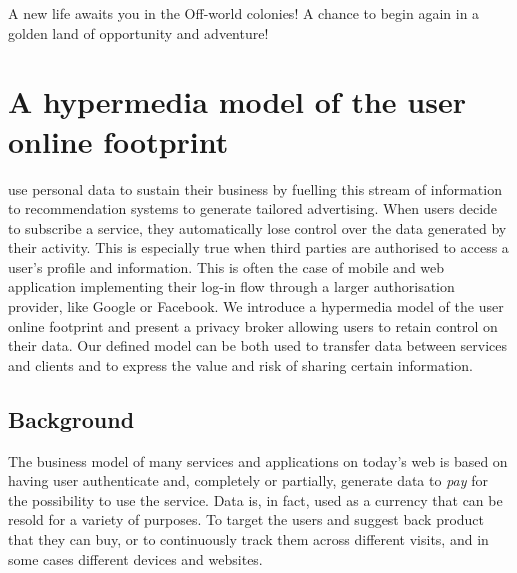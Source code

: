 \begin{savequote}[75mm]
A new life awaits you in the Off-world colonies! A chance to begin again in a golden land of opportunity and adventure!
\end{savequote}

\chapter{A hypermedia model of the user on\hyph line footprint}

 use personal data to sustain their business by fuelling this stream of information to recommendation systems to generate tailored advertising. When users decide to subscribe a service, they automatically lose control over the data generated by their activity. This is especially true when third parties are authorised to access a user's profile and information. This is often the case of mobile and web application implementing their log-in flow through a larger authorisation provider, like Google or Facebook. We introduce a hypermedia model of the user online footprint and present a privacy broker allowing users to retain control on their data. Our defined model can be both used to transfer data between services and clients and to express the value and risk of sharing certain information.

\section{Background}

The business model of many services and applications on today's web is based on having user authenticate and, completely or partially, generate data to \emph{pay} for the possibility to use the service. Data is, in fact, used as a currency that can be resold for a variety of purposes. To target the users and suggest back product that they can buy, or to continuously track them across different visits, and in some cases different devices and websites.


